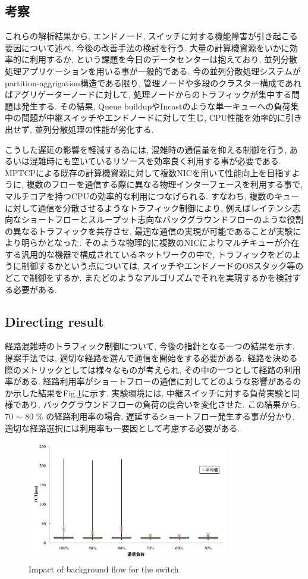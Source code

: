 \subsection{考察}
\label{sec:analysis}
これらの解析結果から, エンドノード, スイッチに対する機能障害が引き起こる要因について述べ, 今後の改善手法の検討を行う.
大量の計算機資源をいかに効率的に利用するか, という課題を今日のデータセンターは抱えており,
並列分散処理アプリケーションを用いる事が一般的である.
今の並列分散処理システムがpartition-aggrigation構造である限り, 管理ノードや多段のクラスター構成であればアグリゲーターノードに対して,
処理ノードからのトラフィックが集中する問題は発生する.
その結果, Queue buildupやIncastのような単一キューへの負荷集中の問題が中継スイッチやエンドノードに対して生じ,
CPU性能を効率的に引き出せず, 並列分散処理の性能が劣化する.

こうした遅延の影響を軽減する為には, 混雑時の通信量を抑える制御を行う, あるいは混雑時にも空いているリソースを効率良く利用する事が必要である.
MPTCPによる既存の計算機資源に対して複数NICを用いて性能向上を目指すように,
複数のフローを通信する際に異なる物理インターフェースを利用する事で, マルチコアを持つCPUの効率的な利用につなげられる.
すなわち, 複数のキューに対して通信を分散させるようなトラフィック制御により,
例えばレイテンシ志向なショートフローとスループット志向なバックグラウンドフローのような役割の異なるトラフィックを共存させ,
最適な通信の実現が可能であることが実験により明らかとなった.
そのような物理的に複数のNICによりマルチキューが介在する汎用的な機器で構成されているネットワークの中で,
トラフィックをどのように制御するかという点については, スイッチやエンドノードのOSスタック等のどこで制御をするか, またどのようなアルゴリズムでそれを実現するかを検討する必要がある.

\subsection{Directing result}
\label{sec:analysis}
経路混雑時のトラフィック制御について, 今後の指針となる一つの結果を示す.
提案手法では, 適切な経路を選んで通信を開始をする必要がある.
経路を決める際のメトリックとしては様々なものが考えられ, その中の一つとして経路の利用率がある.
経路利用率がショートフローの通信に対してどのような影響があるのか示した結果をFig.\ref{fig:load_test}に示す.
実験環境には, 中継スイッチに対する負荷実験と同様であり, バックグラウンドフローの負荷の度合いを変化させた.
この結果から, 70 $\sim$ 80 $ \% $ の経路利用率の場合, 遅延するショートフロー発生する事が分かり,
適切な経路選択には利用率も一要因として考慮する必要がある.

\begin{figure}[t]
    \begin{center}
    \includegraphics[autoebb, width=250pt]{./img/load_test.pdf}
    \caption{Impact of background flow for the switch}
    \label{fig:load_test}
    \end{center}
\end{figure}
